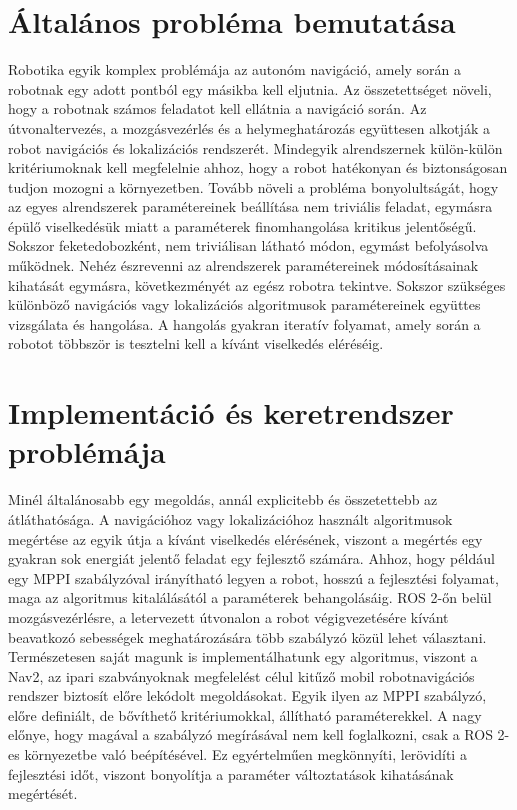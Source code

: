 \section{Általános probléma bemutatása}
Robotika egyik komplex problémája az autonóm navigáció, amely során a robotnak egy adott pontból egy másikba kell eljutnia. Az összetettséget növeli, hogy a robotnak számos feladatot kell ellátnia a navigáció során. Az útvonaltervezés, a mozgásvezérlés és a helymeghatározás együttesen alkotják a robot navigációs és lokalizációs rendszerét. Mindegyik alrendszernek külön-külön kritériumoknak kell megfelelnie ahhoz, hogy a robot hatékonyan és biztonságosan tudjon mozogni a környezetben. Tovább növeli a probléma bonyolultságát, hogy az egyes alrendszerek paramétereinek beállítása nem triviális feladat, egymásra épülő viselkedésük miatt a paraméterek finomhangolása kritikus jelentőségű. Sokszor feketedobozként, nem triviálisan látható módon, egymást befolyásolva működnek. Nehéz észrevenni az alrendszerek paramétereinek módosításainak kihatását egymásra, következményét az egész robotra tekintve. Sokszor szükséges különböző navigációs vagy lokalizációs algoritmusok paramétereinek együttes vizsgálata és hangolása. A hangolás gyakran iteratív folyamat, amely során a robotot többször is tesztelni kell a kívánt viselkedés eléréséig.

\section{Implementáció és keretrendszer problémája}
Minél általánosabb egy megoldás, annál explicitebb és összetettebb az átláthatósága. A navigációhoz vagy lokalizációhoz használt algoritmusok megértése az egyik útja a kívánt viselkedés elérésének, viszont a megértés egy gyakran sok energiát jelentő feladat egy fejlesztő számára. Ahhoz, hogy például egy MPPI szabályzóval irányítható legyen a robot, hosszú a fejlesztési folyamat, maga az algoritmus kitalálásától a paraméterek behangolásáig. ROS 2-őn belül mozgásvezérlésre, a letervezett útvonalon a robot végigvezetésére kívánt beavatkozó sebességek meghatározására több szabályzó közül lehet választani. Természetesen saját magunk is implementálhatunk egy algoritmus, viszont a Nav2, az ipari szabványoknak megfelelést célul kitűző mobil robotnavigációs rendszer biztosít előre lekódolt megoldásokat. Egyik ilyen az MPPI szabályzó, előre definiált, de bővíthető kritériumokkal, állítható paraméterekkel. A nagy előnye, hogy magával a szabályzó megírásával nem kell foglalkozni, csak a ROS 2-es környezetbe való beépítésével. Ez egyértelműen megkönnyíti, lerövidíti a fejlesztési időt, viszont bonyolítja a paraméter változtatások kihatásának megértését.


